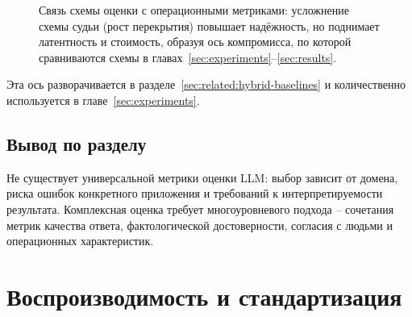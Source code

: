 \begin{figure}[htbp]
    \centering
    \caption{Связь схемы оценки с операционными метриками: усложнение
    схемы судьи (рост перекрытия) повышает надёжность, но поднимает
    латентность и стоимость, образуя ось компромисса, по которой
    сравниваются схемы в главах~\ref{sec:experiments}--\ref{sec:results}.}
    \label{fig:quality-cost-axis}
\end{figure}

Эта ось разворачивается в разделе~\ref{sec:related:hybrid-baselines}
и количественно используется в главе~\ref{sec:experiments}.

\subsection{Вывод по разделу}

Не существует универсальной метрики оценки LLM: выбор зависит от
домена, риска ошибок конкретного приложения и требований к
интерпретируемости результата.
Комплексная оценка требует многоуровневого подхода -- сочетания
метрик качества ответа, фактологической достоверности, согласия с
людьми и операционных характеристик.

\section{Воспроизводимость и стандартизация}
\label{sec:related:reproducibility}


